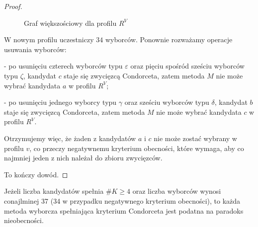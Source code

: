 \documentclass[12pt,a4paper]{mwrep}
\begin{document}
\begin{proof}
		\begin{figure}[H]
			\centering
			
			
			\caption{Graf większościowy dla profilu \(R^V\)}
			\label{fig:graf_v}
			
		\end{figure}
		
		W nowym profilu uczestniczy \(34\) wyborców. Ponownie rozważamy operacje usuwania wyborców:
		
		- po usunięciu czterech wyborców typu \(\varepsilon\) oraz pięciu spośród sześciu wyborców typu \(\zeta\), kandydat \(c\) staje się zwycięzcą Condorceta, zatem metoda \(M\) nie może wybrać kandydata \(a\) w profilu \(R^V\);
		
		- po usunięciu jednego wyborcy typu \(\gamma\) oraz sześciu wyborców typu \(\delta\), kandydat \(b\) staje się zwycięzcą Condorceta, zatem metoda \(M\) nie może wybrać kandydata \(c\) w profilu \(R^V\).
		
		Otrzymujemy więc, że żaden z kandydatów \(a\) i \(c\) nie może zostać wybrany w profilu \(v\), co przeczy negatywnemu kryterium obecności, które wymaga, aby co najmniej jeden z nich należał do zbioru zwycięzców.
		
		To kończy dowód.
	\end{proof}	
	
	\begin{theorem}
		\label{tw:moulin-final}
		Jeżeli liczba kandydatów spełnia \(\#K \geq 4\) oraz liczba wyborców wynosi conajlminej 37 (34 w przypadku negatywnego kryterium obecności), to każda metoda wyborcza spełniająca kryterium Condorceta jest podatna na paradoks nieobecności.
	\end{theorem}
	
\end{document}
